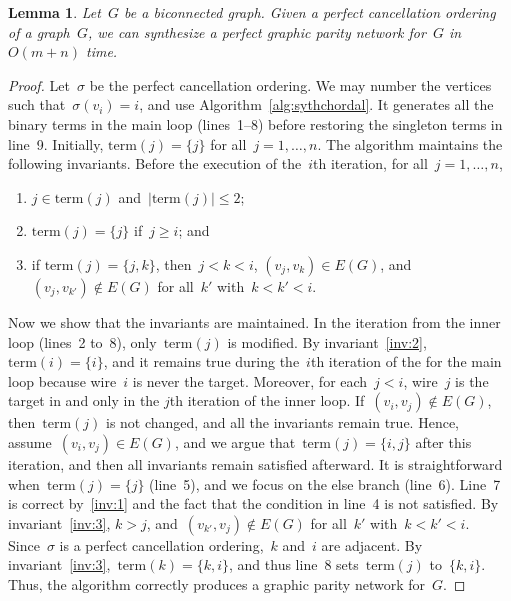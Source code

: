 \documentclass[a4paper,cleveref, autoref, 11pt, fleqn, thm-restate]{article}
\theoremstyle{plain}
\newtheorem{lemma}[theorem]{Lemma}
\renewcommand{\ket}[1]{\{#1\}}
\begin{document}
\begin{lemma}
  \label{lem:comp-cond}
  Let~$G$ be a biconnected graph.
  Given a perfect cancellation ordering of a graph~$G$, we can synthesize a perfect graphic parity network for~$G$ in~$O(m + n)$ time.
\end{lemma}
\begin{proof}
  Let~$\sigma$ be the perfect cancellation ordering.
  We may number the vertices such that~$\sigma(v_{i}) = i$, and use Algorithm~\ref{alg:sythchordal}.  It generates all the binary terms in the main loop (lines~1--8) before restoring the singleton terms in line~9.
  Initially, $\mathrm{term}(j) = \{j\}$ for all~$j = 1, \ldots, n$.
  The algorithm maintains the following invariants.  Before the execution of the~$i$th iteration, for all~$j = 1, \ldots, n$,
  \begin{enumerate}[label={(I\arabic*)},left=10pt]
    \item\label{inv:1} $j\in \mathrm{term}(j)$ and~$|\mathrm{term}(j)| \le 2$;
    \item\label{inv:2} $\mathrm{term}(j) = \ket{j}$ if~$j \ge i$; and
    \item\label{inv:3} if $\mathrm{term}(j) = \ket{j, k}$, then~$j < k < i$, $(v_j, v_k)\in E(G)$, and~$(v_j, v_{k'})\not\in E(G)$ for all~$k'$ with~$k < k' < i$.
  \end{enumerate}
  Now we show that the invariants are maintained.
  In the iteration from the inner loop (lines~2 to~8), only~$\mathrm{term}(j)$ is modified.
  By invariant~\ref{inv:2},~$\mathrm{term}(i) = \ket{i}$, and it remains true during the~$i$th iteration of the for the main loop because wire~$i$ is never the target.
  Moreover, for each~$j < i$, wire~$j$ is the target in and only in the $j$th iteration of the inner loop.
  If~$(v_i, v_j)\not\in E(G)$, then~$\mathrm{term}(j)$ is not changed, and all the invariants remain true.
  Hence, assume~$(v_i, v_j)\in E(G)$, and we argue that~$\mathrm{term}(j) =\ket{i, j}$ after this iteration, and then all invariants remain satisfied afterward.
  It is straightforward when~$\mathrm{term}(j) =\ket{j}$ (line~5), and we focus on the else branch (line~6).
  Line~7 is correct by~\ref{inv:1} and the fact that the condition in line~4 is not satisfied.
  By invariant~\ref{inv:3}, $k > j$, and~$(v_{k'}, v_j)\not\in E(G)$ for all~$k'$ with~$k < k' < i$.
  Since~$\sigma$ is a perfect cancellation ordering,~$k$ and~$i$ are adjacent.
  By invariant~\ref{inv:3},~$\mathrm{term}(k) =\ket{k, i}$, and thus line~8 sets~$\mathrm{term}(j)$ to~$\ket{k, i}$.
  Thus, the algorithm correctly produces a graphic parity network for~$G$.


\end{proof}
\end{document}
